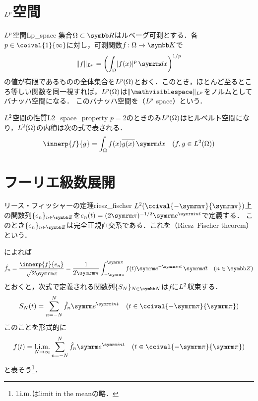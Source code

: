 \documentclass[../../main]{subfiles}
\begin{document}
\section{\texorpdfstring{\(L^p\)}{Lp}空間}
\label{section:lp_space}

\begin{definition}{\(L^p\)空間}{Lp_space}
  集合\(\Omega\subset\numset{R}\)はルベーグ可測とする．各\(p\in\coival{1}{\infty}\)に対し，可測関数\(f\colon\Omega\to\numset{K}\)で
  \[
    \vnorm{f}_{\Lebesgue{p}} = \pqty*{\int_\Omega\abs{f(x)}^p\intd{x}}^{1/p}
  \]
  の値が有限であるものの全体集合を\(L^p(\Omega)\)とおく．このとき，ほとんど至るところ等しい関数を同一視すれば，\(L^p(\Omega)\)は\(\vnorm{\holder}_{\Lebesgue{p}}\)をノルムとしてバナッハ空間になる．
  このバナッハ空間を（\(L^p\) space）という．
\end{definition}

\begin{proposition}{\(L^2\)空間の性質}{L2_space_property}
  \(p=2\)のときのみ\(L^p(\Omega)\)はヒルベルト空間になり，\(L^2(\Omega)\)の内積は次の式で表される．
  \[
    \innerp{f}{g} = \int_\Omega f(x)\conj*{g(x)}\intd{x}\quad(f,g\in\Lebesgue{2}(\Omega))
  \]
\end{proposition}

\section{フーリエ級数展開}

\begin{theorem}{リース・フィッシャーの定理}{riesz_fischer}
  \(\Lebesgue{2}(\ccival{-\krez}{\krez})\)上の関数列\(\seq{e_n}_{n\in\numset{Z}}\)を\(e_n(t)=(2\krez)^{-1/2}\napr^{\iuni nt}\)で定義する．
  このとき\(\seq{e_n}_{n\in\numset{Z}}\)は完全正規直交系である．これを（Riesz–Fischer theorem）という．
\end{theorem}

によれば
\[
  \hat{f}_n = \frac{\innerp{f}{e_n}}{\sqrt{2\krez}}
  = \frac{1}{2\krez}\int_{-\krez}^{\krez}f(t)\napr^{-\iuni nt}\intd{t}\quad(n\in\numset{Z})
\]
とおくと，次式で定義される関数列\(\seq{S_N}_{N\in\numset{N}}\)は\(f\)に\(L^2\)収束する．
\[
  S_N(t) = \sum_{n=-N}^N\hat{f}_n\napr^{\iuni nt}\quad(t\in\ccival{-\krez}{\krez})
\]
このことを形式的に
\[
  f(t) = \sqlim_{N\to\infty}\sum_{n=-N}^N\hat{f}_n\napr^{\iuni nt}\quad(t\in\ccival{-\krez}{\krez})
\]
と表そう\footnote{\(\operatorname*{l{.}i{.}m{.}}\)はlimit in the meanの略．}．
\end{document}
